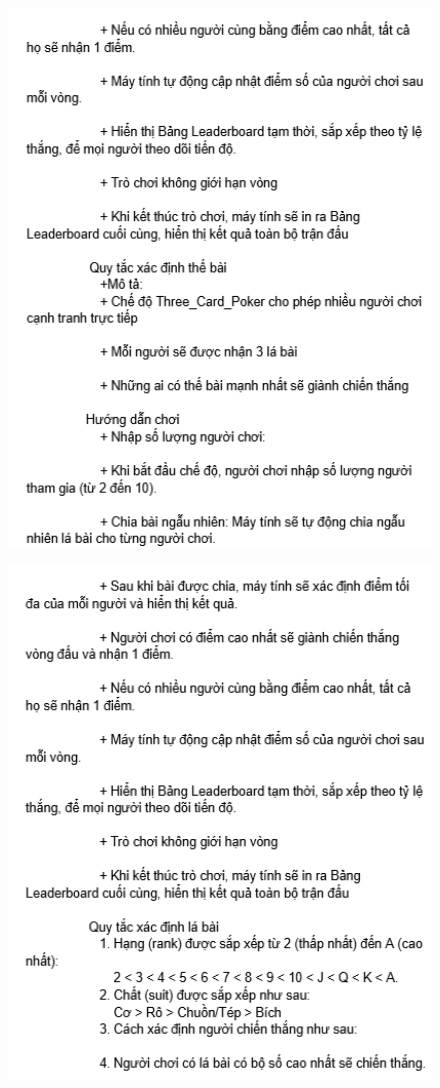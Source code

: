 \documentclass{article}
\begin{document}
    \begin{figure}
        \centering
        \includegraphics[width=1\textwidth]{images/screenshot/4_a_9.png}
    \end{figure}
    \begin{figure}
        \centering
        \includegraphics[width=1\textwidth]{images/screenshot/4_a_10.png}
    \end{figure}
\end{document}

